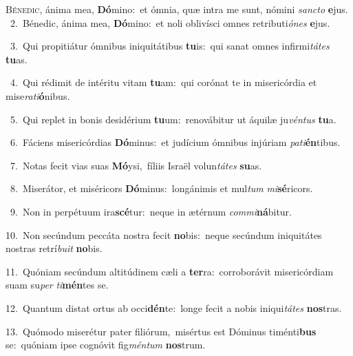 \lettrine{\initial\textcolor{\initialcolor}{B}}{énedic,} ánima mea, \textbf{Dó}\-mino:~\star et ómnia, quæ intra me sunt, nómini \textit{sanc}\-\textit{to} \textbf{e}\-jus.\\
{\numbfont\textcolor{\numbcolor}{~2.}}~Bénedic, ánima mea, \textbf{Dó}\-mino:~\star et noli oblivísci omnes retributi\-\textit{ó}\-\textit{nes} \textbf{e}\-jus.\par
{\numbfont\textcolor{\numbcolor}{~3.}}~Qui propitiátur ómnibus iniquitátibus \textbf{tu}\-is:~\star qui sanat omnes infirmi\-\textit{tá}\-\textit{tes} \textbf{tu}\-as.\par
{\numbfont\textcolor{\numbcolor}{~4.}}~Qui rédimit de intéritu vitam \textbf{tu}\-am:~\star qui corónat te in misericórdia et mise\-\textit{ra}\-\textit{ti}\textbf{ó}nibus.\par
{\numbfont\textcolor{\numbcolor}{~5.}}~Qui replet in bonis desidérium \textbf{tu}\-um:~\star renovábitur ut áquilæ ju\-\textit{vén}\-\textit{tus} \textbf{tu}\-a.\par
{\numbfont\textcolor{\numbcolor}{~6.}}~Fáciens misericórdias \textbf{Dó}\-minus:~\star et judícium ómnibus injúriam \textit{pa}\-\textit{ti}\textbf{én}tibus.\par
{\numbfont\textcolor{\numbcolor}{~7.}}~Notas fecit vias suas \textbf{Mó}\-ysi,~\star fíliis Israël volun\-\textit{tá}\-\textit{tes} \textbf{su}\-as.\par
{\numbfont\textcolor{\numbcolor}{~8.}}~Miserátor, et miséricors \textbf{Dó}\-minus:~\star longánimis et mul\textit{tum} \textit{mi}\-\textbf{sé}ricors.\par
{\numbfont\textcolor{\numbcolor}{~9.}}~Non in perpétuum ira\-\textbf{scé}\-tur:~\star neque in ætérnum \textit{com}\-\textit{mi}\textbf{ná}bitur.\par
{\numbfont\textcolor{\numbcolor}{10.}}~Non secúndum peccáta nostra fecit \textbf{no}\-bis:~\star neque secúndum iniquitátes nostras retrí\-\textit{bu}\-\textit{it} \textbf{no}\-bis.\par
{\numbfont\textcolor{\numbcolor}{11.}}~Quóniam secúndum altitúdinem cæli a \textbf{ter}\-ra:~\star corroborávit misericórdiam suam su\textit{per} \textit{ti}\-\textbf{mén}tes se.\par
{\numbfont\textcolor{\numbcolor}{12.}}~Quantum distat ortus ab occi\-\textbf{dén}\-te:~\star longe fecit a nobis iniqui\-\textit{tá}\-\textit{tes} \textbf{nos}\-tras.\par
{\numbfont\textcolor{\numbcolor}{13.}}~Quómodo miserétur pater filiórum,~\dagger misértus est Dóminus timénti\textbf{bus} se:~\star quóniam ipse cognóvit fig\-\textit{mén}\-\textit{tum} \textbf{nos}\-trum.\par
